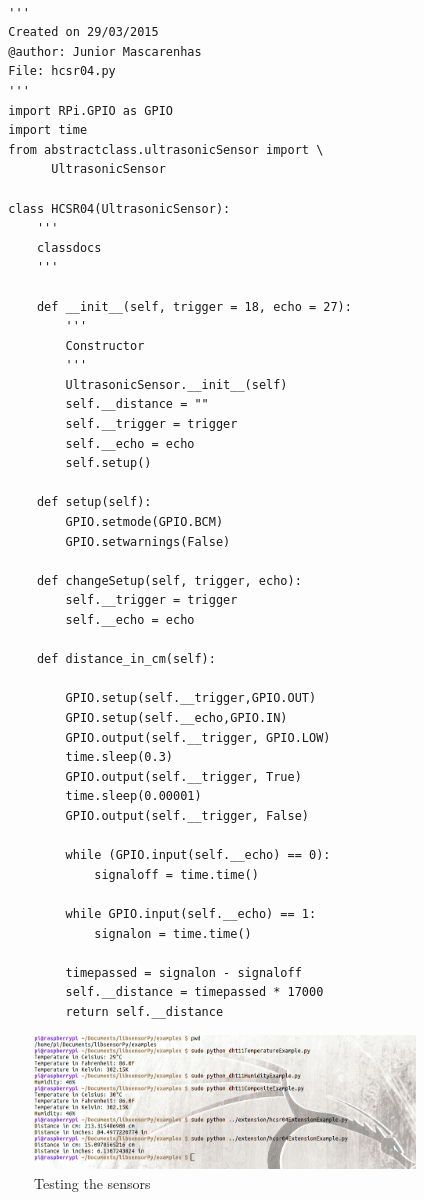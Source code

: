 \documentclass{acm_proc_article-sp}
\begin{document}
\renewcommand{\theFancyVerbLine}{
  \sffamily\textcolor[rgb]{0.5,0.5,0.5}{\scriptsize\arabic{FancyVerbLine}}}
\begin{verbatim}

  '''
  Created on 29/03/2015
  @author: Junior Mascarenhas
  File: hcsr04.py
  '''
  import RPi.GPIO as GPIO
  import time
  from abstractclass.ultrasonicSensor import \
  		UltrasonicSensor

  class HCSR04(UltrasonicSensor):
      '''
      classdocs
      '''

      def __init__(self, trigger = 18, echo = 27):
          '''
          Constructor
          '''
          UltrasonicSensor.__init__(self)
          self.__distance = ""
          self.__trigger = trigger
          self.__echo = echo
          self.setup()
        
      def setup(self):
          GPIO.setmode(GPIO.BCM)
          GPIO.setwarnings(False)

      def changeSetup(self, trigger, echo):
          self.__trigger = trigger
          self.__echo = echo

      def distance_in_cm(self):

          GPIO.setup(self.__trigger,GPIO.OUT)
          GPIO.setup(self.__echo,GPIO.IN)
          GPIO.output(self.__trigger, GPIO.LOW)
          time.sleep(0.3)
          GPIO.output(self.__trigger, True)
          time.sleep(0.00001)
          GPIO.output(self.__trigger, False)

          while (GPIO.input(self.__echo) == 0):
              signaloff = time.time()

          while GPIO.input(self.__echo) == 1:
              signalon = time.time()

          timepassed = signalon - signaloff
          self.__distance = timepassed * 17000
          return self.__distance

\end{verbatim}
\begin{figure}[ht]
    \centering
    	\includegraphics[width=0.9\textwidth]{pictures/tests2.png}
    		\caption{Testing the sensors}  
    		\label{fig:results}  	
\end{figure}
\end{document}
